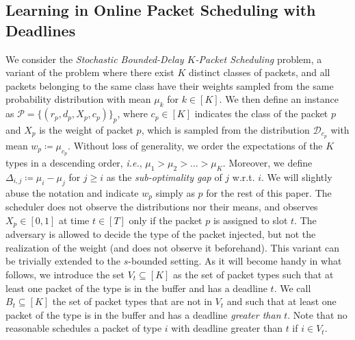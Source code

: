 
\subsection{Learning in Online Packet Scheduling with Deadlines} 
\label{sec:prob_form}
We consider the \textit{Stochastic Bounded-Delay $K$-Packet Scheduling} problem, a variant of the problem where there exist $K$ distinct classes of packets, and all packets belonging to the same class have their weights sampled from the same probability distribution with mean $\mu_k$ for $k\in[K]$. We then define an instance as $\mathcal{P}= \{(r_p, d_p, X_p, c_p)\}_{p}$, where $c_p \in [K]$ indicates the class of the packet $p$ and $X_p$ is the weight of packet $p$, which is sampled from the distribution $\mathcal{D}_{c_p}$ with mean $w_{p} \coloneqq \mu_{c_p}$. Without loss of generality, we order the expectations of the $K$ types in a descending order, \emph{i.e.}, $\mu_1 > \mu_2 > \ldots > \mu_K$. Moreover, we define $\Delta_{i,j} \coloneqq \mu_i - \mu_j$ for $j \ge i$ as the \textit{sub-optimality gap} of $j$ w.r.t. $i$. We will slightly abuse the notation and indicate $w_p$ simply as $p$ for the rest of this paper. The scheduler does not observe the distributions nor their means, and observes $X_{p} \in [0,1]$ at time $t \in [T]$ only if the packet $p$ is assigned to slot $t$. The adversary is allowed to decide the type of the packet injected, but not the realization of the weight (and does not observe it beforehand). This variant can be trivially extended to the $s$-bounded setting. As it will become handy in what follows, we introduce the set $V_t \subseteq [K]$ as the set of packet types such that at least one packet of the type is in the buffer and has a deadline $t$. We call $B_t \subseteq [K]$ the set of packet types that are not in $V_t$ and such that at least one packet of the type is in the buffer and has a deadline \textit{greater than} $t$. Note that no reasonable \alg schedules a packet of type $i$ with deadline greater than $t$ if $i \in V_t$.

